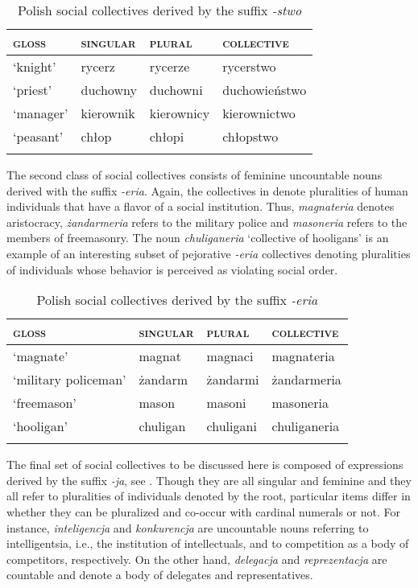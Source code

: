 \documentclass[output=paper]{langscibook}
\begin{document}
\begin{table}[h!]
\caption{Polish social collectives derived by the suffix \textit{-stwo}} 
\label{wan:tab:rycerstwo}
 \begin{tabular}{llll} 
  \lsptoprule
           \textsc{gloss} & \textsc{singular} & \textsc{plural} & \textsc{collective} \\ 
  \midrule
  `knight'  &   rycerz &    rycerze  &    rycerstwo \\
  `priest'  &   duchowny &   duchowni &    duchowieństwo \\
  `manager'  &   kierownik &   kierownicy &    kierownictwo \\
  `peasant'  &   chłop &   chłopi &    chłopstwo \\
  \lspbottomrule
 \end{tabular}
\end{table}

The second class of social collectives consists of feminine uncountable nouns derived with the suffix \textit{-eria}. Again, the collectives in  denote pluralities of human individuals that have a flavor of a social institution. Thus, \textit{magnateria} denotes aristocracy, \textit{żandarmeria} refers to the military police and \textit{masoneria} refers to the members of freemasonry. The noun \textit{chuliganeria} `collective of hooligans' is an example of an interesting subset of pejorative \textit{-eria} collectives denoting pluralities of individuals whose behavior is perceived as violating social order. 

\begin{table}[h!]
\caption{Polish social collectives derived by the suffix \textit{-eria}} 
\label{wan:tab:magnateria}
 \begin{tabular}{llll} 
  \lsptoprule
          \textsc{gloss}  & \textsc{singular} & \textsc{plural} & \textsc{collective} \\ 
  \midrule
  `magnate'  &   magnat &    magnaci  &    magnateria \\
  `military policeman'  &   żandarm &   żandarmi &    żandarmeria \\
  `freemason'  &   mason &   masoni &    masoneria \\
  `hooligan'  &   chuligan &   chuligani &    chuliganeria \\
  \lspbottomrule
 \end{tabular}
\end{table}

The final set of social collectives to be discussed here is composed of expressions derived by the suffix \textit{-ja}, see . Though they are all singular and feminine and they all refer to pluralities of individuals denoted by the root, particular items differ in whether they can be pluralized and co-occur with cardinal numerals or not. For instance, \textit{inteligencja} and \textit{konkurencja} are uncountable nouns referring to intelligentsia, i.e., the institution of intellectuals, and to competition as a body of competitors, respectively. On the other hand, \textit{delegacja} and \textit{reprezentacja} are countable and denote a body of delegates and representatives.
\end{document}
